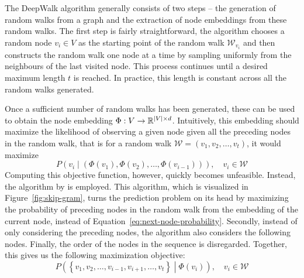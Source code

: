 The DeepWalk algorithm generally consists of two steps -- the generation of random walks from a graph and the extraction of node embeddings from these random walks. The first step is fairly straightforward, the algorithm chooses a random node \( v_i \in V \) as the starting point of the random walk \( \mathcal{W}_{v_i} \) and then constructs the random walk one node at a time by sampling uniformly from the neighbours of the last visited node. This process continues until a desired maximum length \( t \) is reached. In practice, this length is constant across all the random walks generated.

Once a sufficient number of random walks has been generated, these can be used to obtain the node embedding \( \Phi : V \to \mathbb{R}^{\left\lvert V \right\rvert \times d} \). Intuitively, this embedding should maximize the likelihood of observing a given node given all the preceding nodes in the random walk, that is for a random walk \( \mathcal{W} = \left( v_1, v_2, \dots, v_t \right) \), it would maximize
\begin{equation}\label{eq:next-node-probability}
	P \left( v_i \middle| \left( \Phi \left( v_1 \right), \Phi \left( v_2 \right), \dots, \Phi \left( v_{i-1} \right) \right) \right), \quad v_i \in \mathcal{W}
\end{equation}
Computing this objective function, however, quickly becomes unfeasible. Instead, the  algorithm by \cite{mikolov_efficient_2013} is employed. This algorithm, which is visualized in Figure~\ref{fig:skip-gram}, turns the prediction problem on its head by maximizing the probability of preceding nodes in the random walk from the embedding of the current node, instead of Equation~\ref{eq:next-node-probability}. Secondly, instead of only considering the preceding nodes, the algorithm also considers the following nodes. Finally, the order of the nodes in the sequence is disregarded. Together, this gives us the following maximization objective:
\begin{equation}\label{eq:deepwalk-objective}
	P \left( \left\{ v_1, v_2 , \dots, v_{i-1}, v_{i+1}, \dots, v_t \right\} \middle| \Phi \left( v_i \right) \right), \quad v_i \in \mathcal{W}
\end{equation}

